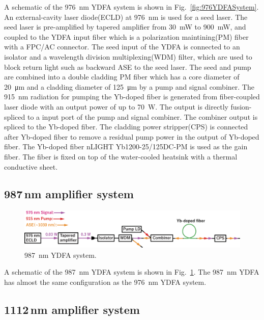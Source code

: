 \documentclass{osa-article}
\begin{document}
A schematic of the \SI{976}{nm} YDFA system is shown in Fig.~\ref{fig:976YDFASystem}.
An external-cavity laser diode(ECLD) at \SI{976}{nm} is used for a seed laser.
The seed laser is pre-amplified by tapered amplifier from \SI{30}{mW} to \SI{900}{mW}, and coupled to the YDFA input fiber which is a polarization maintining(PM) fiber with a FPC/AC connector.
The seed input of the YDFA is connected to an isolator and a wavelength division multiplexing(WDM) filter, which are used to block return light such as backward ASE to the seed laser.
The seed and pump are combined into a double cladding PM fiber which has a core diameter of \SI{20}{\micro m} and a cladding diameter of \SI{125}{\micro m} by a pump and signal combiner.
The \SI{915}{nm} radiation for pumping the Yb-doped fiber is generated from fiber-coupled laser diode with an output power of up to \SI{70}{W}.
The output is directly fusion-spliced to a input port of the pump and signal combiner.
The combiner output is spliced to the Yb-doped fiber.
The cladding power stripper(CPS) is connected after Yb-doped fiber to remove a residual pump power in the output of Yb-doped fiber.
The Yb-doped fiber nLIGHT Yb1200-25/125DC-PM is used as the gain fiber.
The fiber is fixed on top of the water-cooled heatsink with a thermal conductive sheet.


\subsection{987\,nm amplifier system}

\begin{figure}[h!]
\centering\includegraphics[width=\linewidth]{./Figure/976nmYDFASystem.eps}
\caption{\SI{987}{nm} YDFA system.}
\label{fig:987YDFASystem}
\end{figure}

A schematic of the \SI{987}{nm} YDFA system is shown in Fig.~\ref{fig:987YDFASystem}.
The \SI{987}{nm} YDFA has almost the same configuration as the \SI{976}{nm} YDFA system.


\subsection{1112\,nm amplifier system}
\end{document}
